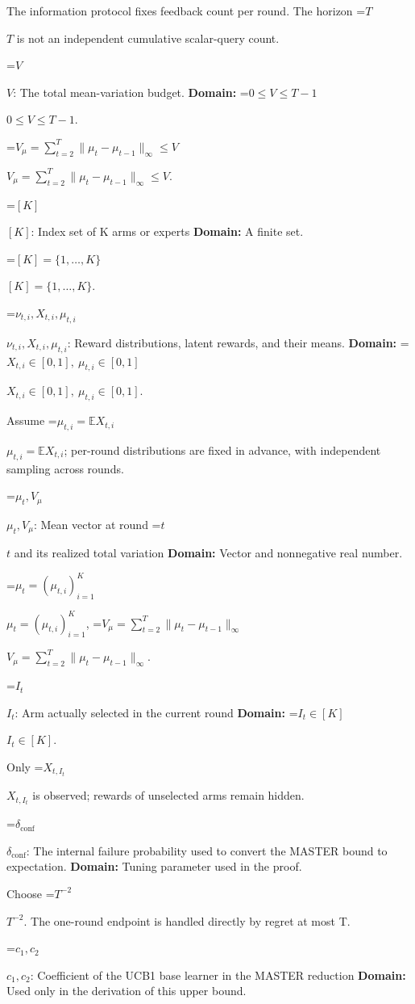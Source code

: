 \documentclass[10pt,a4paper]{article}
\newcommand{\AtlasMath}[1]{\par\begingroup\centering\setbox0=\hbox{$\displaystyle #1$}\ifdim\wd0>1.4\linewidth\typeout{ATLAS WIDE FORMULA: \the\wd0}\fi\ifdim\wd0>\linewidth\resizebox{\linewidth}{!}{\box0}\else\box0\fi\par\endgroup}
\newcommand{\AtlasInlineMath}[1]{\begingroup\setbox0=\hbox{$#1$}\ifdim\wd0>.4\linewidth\endgroup\AtlasMath{#1}\else\endgroup$#1$\fi}
\begin{document}
The information protocol fixes feedback count per round. The horizon \AtlasInlineMath{T} is not an independent cumulative scalar-query count.



\AtlasInlineMath{V}: The total mean-variation budget. \textbf{Domain:} \AtlasInlineMath{0\le V\le T-1}.



\AtlasInlineMath{V_\mu=\sum_{t=2}^T\|\mu_t-\mu_{t-1}\|_\infty\le V}.



\AtlasInlineMath{[K]}: Index set of K arms or experts \textbf{Domain:} A finite set.



\AtlasInlineMath{[K]=\{1,\ldots,K\}}.



\AtlasInlineMath{\nu_{t,i},X_{t,i},\mu_{t,i}}: Reward distributions, latent rewards, and their means. \textbf{Domain:} \AtlasInlineMath{X_{t,i}\in[0,1],\ \mu_{t,i}\in[0,1]}.



Assume \AtlasInlineMath{\mu_{t,i}=\mathbb E X_{t,i}}; per-round distributions are fixed in advance, with independent sampling across rounds.



\AtlasInlineMath{\mu_t,V_\mu}: Mean vector at round \AtlasInlineMath{t} and its realized total variation \textbf{Domain:} Vector and nonnegative real number.



\AtlasInlineMath{\mu_t=(\mu_{t,i})_{i=1}^K}, \AtlasInlineMath{V_\mu=\sum_{t=2}^T\|\mu_t-\mu_{t-1}\|_\infty}.



\AtlasInlineMath{I_t}: Arm actually selected in the current round \textbf{Domain:} \AtlasInlineMath{I_t\in[K]}.



Only \AtlasInlineMath{X_{t,I_t}} is observed; rewards of unselected arms remain hidden.



\AtlasInlineMath{\delta_{\mathrm{conf}}}: The internal failure probability used to convert the MASTER bound to expectation. \textbf{Domain:} Tuning parameter used in the proof.



Choose \AtlasInlineMath{T^{-2}}. The one-round endpoint is handled directly by regret at most T.



\AtlasInlineMath{c_1,c_2}: Coefficient of the UCB1 base learner in the MASTER reduction \textbf{Domain:} Used only in the derivation of this upper bound.
\end{document}

